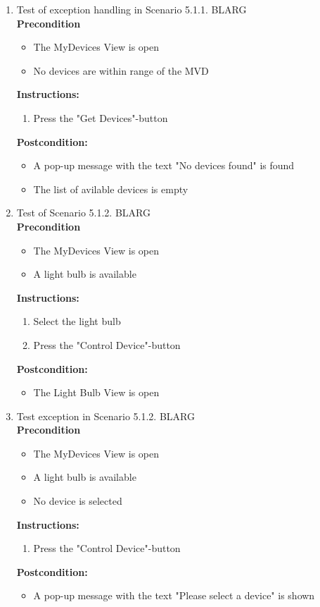 \documentclass[a4paper]{article}
\newlength{\testlabellength}
\newenvironment{testlist}{\begin{enumerate}[label=\bfseries Instruction \thesubsection.\arabic* , labelindent=0pt, labelwidth=\testlabellength , leftmargin=2cm]}{\end{enumerate}}
\newenvironment{precondition}{
{\color{white}BLARG}\\ 
\textbf{Precondition}
\begin{itemize}[labelindent=0cm, labelwidth=2cm , leftmargin=1cm]
}
{\end{itemize}}
\newenvironment{instruction}{
\textbf{Instructions:}
\begin{enumerate}[label=\bfseries  \arabic*., labelindent=0cm, labelwidth=2cm , leftmargin=1cm]
}
{\end{enumerate}}
\newenvironment{postcondition}{
\textbf{Postcondition:}
\begin{itemize}[labelindent=0cm, labelwidth=2cm , leftmargin=1cm]
}
{\end{itemize}}
\begin{document}
\begin{appendices}
\begin{testlist}
	\item Test of exception handling in Scenario 5.1.1.
		\begin{precondition}
			\item The MyDevices View is open
			\item No devices are within range of the MVD
		\end{precondition}
		\begin{instruction}
			\item Press the "Get Devices"-button
		\end{instruction}
		\begin{postcondition}
			\item A pop-up message with the text "No devices found" is found
			\item The list of avilable devices is empty
		\end{postcondition}
	
	\item Test of Scenario 5.1.2.
		\begin{precondition}
			\item The MyDevices View is open
			\item A light bulb is available
		\end{precondition}
		\begin{instruction}
			\item Select the light bulb
			\item Press the "Control Device"-button
		\end{instruction}
		\begin{postcondition}
			\item The Light Bulb View is open
		\end{postcondition}
\newpage

	\item Test exception in Scenario 5.1.2. \label{SystemTest1}
		\begin{precondition}
			\item The MyDevices View is open
			\item A light bulb is available
			\item No device is selected
		\end{precondition}
		\begin{instruction}
			\item Press the "Control Device"-button
		\end{instruction}
		\begin{postcondition}
			\item A pop-up message with the text "Please select a device" is shown
		\end{postcondition}	


\end{testlist}
\end{appendices}
\end{document}
